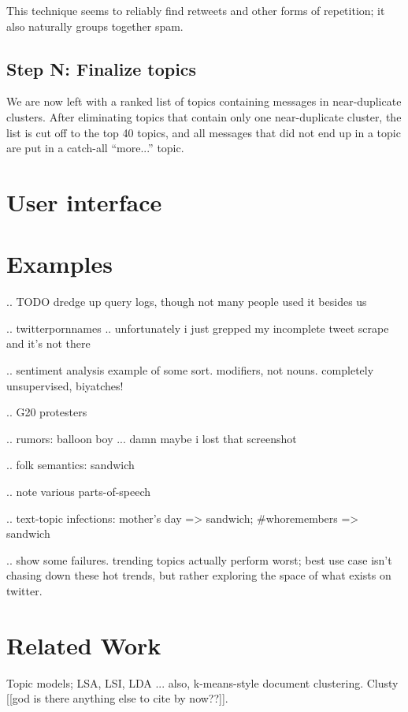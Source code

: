 \documentclass[letterpaper]{article}
\begin{document}
This technique seems to reliably find retweets and other forms of repetition; it also naturally groups together spam.


\subsection{Step N: Finalize topics}

We are now left with a ranked list of topics containing messages in near-duplicate clusters.  After eliminating topics that contain only one near-duplicate cluster, the list is cut off to the top 40 topics, and all messages that did not end up in a topic are put in a catch-all ``more...'' topic.

\section{User interface}

\section{Examples}

.. TODO dredge up query logs, though not many people used it besides us

.. twitterpornnames .. unfortunately i just grepped my incomplete tweet scrape and it's not there

.. sentiment analysis example of some sort.  modifiers, not nouns.  completely unsupervised, biyatches!

.. G20 protesters

.. rumors: balloon boy ... damn maybe i lost that screenshot

.. folk semantics: sandwich

.. note various parts-of-speech

.. text-topic infections: mother's day => sandwich; \#whoremembers => sandwich

.. show some failures.  trending topics actually perform worst; best use case isn't chasing down these hot trends, but rather exploring the space of what exists on twitter.

\section{Related Work}

Topic models; LSA, LSI, LDA ... also, k-means-style document clustering.  Clusty [[god is there anything else to cite by now??]].
\end{document}
